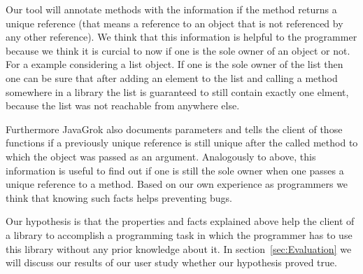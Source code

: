 Our tool will annotate methods with the information if the method returns a 
unique reference (that means a reference to an object that is not referenced 
by any other reference). We think that this information is helpful to the 
programmer because we think it is curcial to now if one is the sole owner of 
an object or not. For a example considering a list object. If one is the sole
owner of the list then one can be sure that after adding an element to the list
and calling a method somewhere in a library the list is guaranteed to still 
contain exactly one elment, because the list was not reachable from anywhere
else.

Furthermore JavaGrok also documents parameters and tells the client
of those functions if a previously unique reference is still unique after the 
called method to which the object was passed as an argument. Analogously to 
above, this information is useful to find out if one is still the sole owner
when one passes a unique reference to a method. Based on our own experience
as programmers we think that knowing such facts helps preventing bugs.

Our hypothesis is that the properties and facts explained above help the 
client of a library to accomplish a programming task in which the programmer
has to use this library without any prior knowledge about it.
In section~\ref{sec:Evaluation} we will discuss our results of our user study
whether our hypothesis proved true.